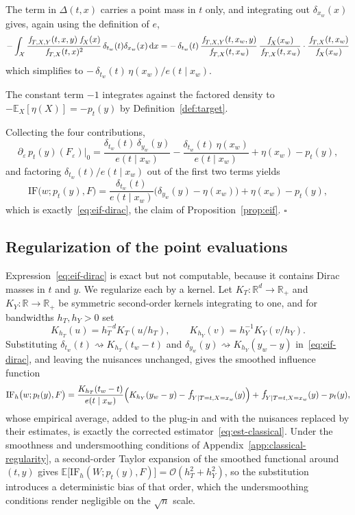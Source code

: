 \documentclass[11pt]{article}
\theoremstyle{plain}
\theoremstyle{definition}
\theoremstyle{remark}
\newcommand{\pE}{\ensuremath{\mathbb{E}}}
\newcommand{\R}{\mathbb{R}}
\newcommand{\cX}{\ensuremath{\mathcal{X}}}
\newcommand{\pf}[1]{\ensuremath{\,\mathlarger{\textit{f}}_{#1}}}
\newcommand{\cO}{\mathcal{O}}
\newcommand{\dd}{\,\mathrm{d}}
\newcommand{\IF}{\mathrm{IF}}
\newcommand{\gps}{e}
\begin{document}
The term in $\Delta(t,x)$ carries a point mass in $t$ only, and integrating out $\delta_{x_w}(x)$
gives, again using the definition of $\gps$,
\[
-\int_{\cX} \frac{\pf{T,X,Y}(t,x,y)\,\pf{X}(x)}{\pf{T,X}(t,x)^2}\,
\delta_{t_w}(t)\delta_{x_w}(x)\dd x
= -\,\delta_{t_w}(t)\,\frac{\pf{T,X,Y}(t,x_w,y)}{\pf{T,X}(t,x_w)}\,\frac{\pf{X}(x_w)}{\pf{T,X}(t,x_w)}\cdot\frac{\pf{T,X}(t,x_w)}{\pf{X}(x_w)}
\]
which simplifies to
$-\,\delta_{t_w}(t)\,\eta(x_w)/\gps(t \mid x_w)$.

The constant term $-1$ integrates against the factored density to $-\pE_X[\eta(X)] = -p_t(y)$
by Definition~\ref{def:target}.

Collecting the four contributions,
\[
\partial_\varepsilon\, p_t(y)(F_\varepsilon)\big|_{0}
= \frac{\delta_{t_w}(t)\,\delta_{y_w}(y)}{\gps(t \mid x_w)}
- \frac{\delta_{t_w}(t)\,\eta(x_w)}{\gps(t \mid x_w)}
+ \eta(x_w) - p_t(y),
\]
and factoring $\delta_{t_w}(t)/\gps(t\mid x_w)$ out of the first two terms yields
\[
\IF\big(w;p_t(y),F\big)
= \frac{\delta_{t_w}(t)}{\gps(t \mid x_w)}\Big(\delta_{y_w}(y) - \eta(x_w)\Big)
+ \eta(x_w) - p_t(y),
\]
which is exactly~\eqref{eq:eif-dirac}, the claim of Proposition~\ref{prop:eif}. \hfill$\square$

\subsection{Regularization of the point evaluations}
\label{app:classical-kernels}

Expression~\eqref{eq:eif-dirac} is exact but not computable, because it contains Dirac masses
in $t$ and $y$. We regularize each by a kernel. Let $K_T : \R^{d} \to \R_+$ and
$K_Y : \R \to \R_+$ be symmetric second-order kernels integrating to one, and for bandwidths
$h_T, h_Y > 0$ set
\begin{equation}
K_{h_T}(u) = h_T^{-d} K_T(u/h_T), \qquad
K_{h_Y}(v) = h_Y^{-1} K_Y(v/h_Y).
\label{eq:kernels}
\end{equation}
Substituting $\delta_{t_w}(t) \rightsquigarrow K_{h_T}(t_w - t)$ and
$\delta_{y_w}(y) \rightsquigarrow K_{h_Y}(y_w - y)$ in~\eqref{eq:eif-dirac}, and leaving the
nuisances unchanged, gives the smoothed influence function
\begin{equation}
\IF_{h}\big(w;p_t(y),F\big)
= \frac{K_{h_T}(t_w-t)}{\gps(t \mid x_w)}
\Big( K_{h_Y}(y_w-y) - \pf{Y \mid T=t,X=x_w}(y) \Big)
+ \pf{Y \mid T=t,X=x_w}(y) - p_t(y),
\label{eq:app-if-smoothed}
\end{equation}
whose empirical average, added to the plug-in and with the nuisances replaced by their
estimates, is exactly the corrected estimator~\eqref{eq:est-classical}. Under the smoothness
and undersmoothing conditions of Appendix~\ref{app:classical-regularity}, a second-order Taylor
expansion of the smoothed functional around $(t,y)$ gives
$\pE\big[\IF_h(W;p_t(y),F)\big] = \cO(h_T^2 + h_Y^2)$, so the substitution introduces a
deterministic bias of that order, which the undersmoothing conditions render negligible on the
$\sqrt n$ scale.
\end{document}
